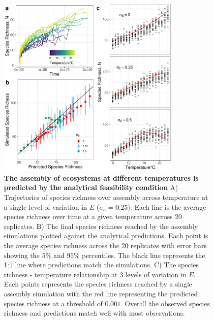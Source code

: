 \documentclass{article}
\begin{document}
\begin{figure}[H]
    \centering
    \includegraphics[width = 0.8\textwidth]{docs/Figures/Fig_sim.pdf}
    \caption{\textbf{The assembly of ecosystems at different temperatures is predicted by the analytical feasibility condition} A) Trajectories of species richness over assembly across temperature at a single level of variation in $E$ ($\sigma_a = 0.25$). Each line is the average species richness over time at a given temperature across 20 replicates. B) The final species richness reached by the assembly simulations plotted against the analytical predictions. Each point is the average species richness across the 20 replicates with error bars showing the 5\% and $95$\% percentiles. The black line represents the 1:1 line where predictions match the simulations. C) The species richness - temperature relationship at 3 levels of variation in $E$. Each points represents the species richness reached by a single assembly simulation with the red line representing the predicted species richness at a threshold of $0.001$. Overall the observed species richness and predictions match well with most observations.}
    \label{Fig:Temperature_assembly}
\end{figure}
\end{document}
